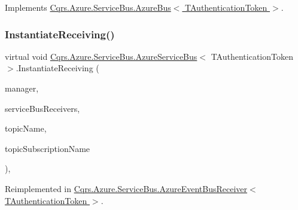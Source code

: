 Implements \hyperlink{classCqrs_1_1Azure_1_1ServiceBus_1_1AzureBus_ac9f66dd531dcde49be72ba8f2cb28e9b_ac9f66dd531dcde49be72ba8f2cb28e9b}{Cqrs.\+Azure.\+Service\+Bus.\+Azure\+Bus$<$ T\+Authentication\+Token $>$}.

\mbox{\label{classCqrs_1_1Azure_1_1ServiceBus_1_1AzureServiceBus_a857b7ac22335476713c601fb1ce649c8_a857b7ac22335476713c601fb1ce649c8}} 
\subsubsection{\texorpdfstring{Instantiate\+Receiving()}{InstantiateReceiving()}\hspace{0.1cm}{\footnotesize\ttfamily [2/2]}}
{\footnotesize\ttfamily virtual void \hyperlink{classCqrs_1_1Azure_1_1ServiceBus_1_1AzureServiceBus}{Cqrs.\+Azure.\+Service\+Bus.\+Azure\+Service\+Bus}$<$ T\+Authentication\+Token $>$.Instantiate\+Receiving (\begin{DoxyParamCaption}\item[{Manager}]{manager,  }\item[{I\+Dictionary$<$ int, I\+Message\+Receiver $>$}]{service\+Bus\+Receivers,  }\item[{string}]{topic\+Name,  }\item[{string}]{topic\+Subscription\+Name }\end{DoxyParamCaption})\hspace{0.3cm}{\ttfamily [protected]}, {\ttfamily [virtual]}}



Reimplemented in \hyperlink{classCqrs_1_1Azure_1_1ServiceBus_1_1AzureEventBusReceiver_a30c7fa1d7da0362b3e83b356c2d48131_a30c7fa1d7da0362b3e83b356c2d48131}{Cqrs.\+Azure.\+Service\+Bus.\+Azure\+Event\+Bus\+Receiver$<$ T\+Authentication\+Token $>$}.

\mbox{\label{classCqrs_1_1Azure_1_1ServiceBus_1_1AzureServiceBus_ae4b736019e332a81eb08d3696f8b6e7e_ae4b736019e332a81eb08d3696f8b6e7e}} 
